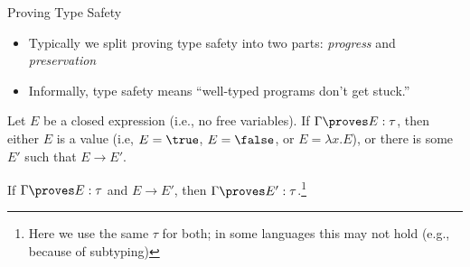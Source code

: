 \documentclass[leqno,presentation,usenames,dvipsnames]{beamer}
\begin{document}
\begin{frame}{Proving Type Safety}
    \begin{itemize}
        \item Typically we split proving type safety into two parts: \emph{progress} and \emph{preservation}
        \item Informally, type safety means ``well-typed programs don't get stuck.''
    \end{itemize}

\begin{theorem}[Progress]
    Let $E$ be a closed expression (i.e., no free variables).
    If $\Gamma \proves E : \tau$, then either $E$ is a value (i.e, $E = \true$, $E = \false$, or $E = \lambda x. E$), or there is some $E'$ such that $E \to E'$.
\end{theorem}

\begin{theorem}[Preservation]
    If $\Gamma \proves E : \tau$ and $E \to E'$, then $\Gamma \proves E' : \tau$.\footnote{Here we use the same $\tau$ for both; in some languages this may not hold (e.g., because of subtyping)}
\end{theorem}
\end{frame}
\end{document}
